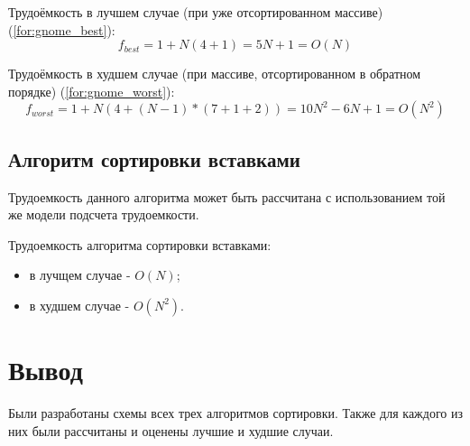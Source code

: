 Трудоёмкость в лучшем случае (при уже отсортированном массиве) (\ref{for:gnome_best}):
\begin{equation}
	\label{for:gnome_best}
    f_{best} = 1 + N(4 + 1) = 5N + 1 = O(N)
\end{equation}

Трудоёмкость в худшем случае (при массиве, отсортированном в обратном порядке) (\ref{for:gnome_worst}):
\begin{equation}
	\label{for:gnome_worst}
    f_{worst} = 1 + N(4 + (N - 1) * (7 + 1 + 2)) = 10N^2 - 6N + 1 = O(N^2)
\end{equation}


\subsection{Алгоритм сортировки вставками}
Трудоемкость данного алгоритма может быть рассчитана с использованием той же модели подсчета трудоемкости.

Трудоемкость алгоритма сортировки вставками:
\begin{itemize}
	\item в лучщем случае - $O(N)$;
    \item в худшем случае - $O(N^2)$. \newline
\end{itemize}



\section*{Вывод}

Были разработаны схемы всех трех алгоритмов сортировки. Также для каждого из них были рассчитаны и оценены лучшие и худшие случаи.
